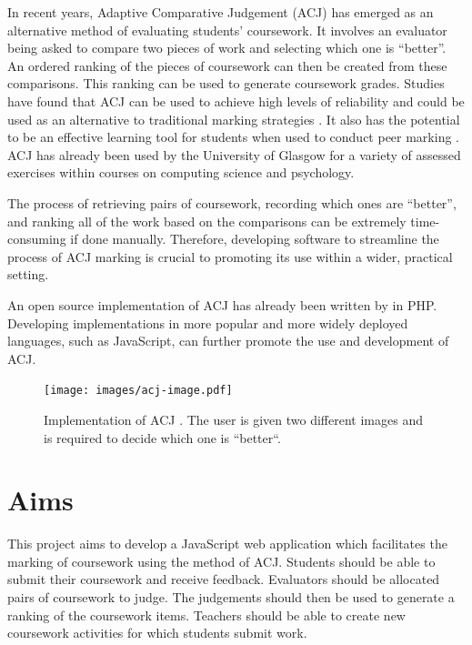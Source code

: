 \documentclass{l4proj}
\begin{document}
In recent years, Adaptive Comparative Judgement (ACJ) has emerged as an alternative method of evaluating students’ coursework. It involves an evaluator being asked to compare two pieces of work and selecting which one is “better”. An ordered ranking of the pieces of coursework can then be created from these comparisons. This ranking can be used to generate coursework grades. Studies have found that ACJ can be used to achieve high levels of reliability and could be used as an alternative to traditional marking strategies \citep{inproceedings, doi:10.1080/0969594X.2013.868341} . It also has the potential to be an effective learning tool for students when used to conduct peer marking \citep{bartholomew2019using}. ACJ has already been used by the University of Glasgow for a variety of assessed exercises within courses on computing science and psychology.

The process of retrieving pairs of coursework, recording which ones are “better”, and ranking all of the work based on the comparisons can be extremely time-consuming if done manually. Therefore, developing software to streamline the process of ACJ marking is crucial to promoting its use within a wider, practical setting.

An open source implementation of ACJ has already been written by \citet{nbarr:code} in PHP. Developing implementations in more popular and more widely deployed languages, such as JavaScript, can further promote the use and development of ACJ.


\begin{figure}
    \centering
    \texttt{[image: images/acj-image.pdf]}    

    \caption{ Implementation of ACJ \citep{nbarr}. The user is given two different images and is required to decide which one is ``better``.
    }
    \label{fig:acj-image} 
\end{figure}

\section{Aims}
This project aims to develop a JavaScript web application which facilitates the marking of coursework using the method of ACJ. Students should be able to submit their coursework and receive feedback. Evaluators should be allocated pairs of coursework to judge. The judgements should then be used to generate a ranking of the coursework items. Teachers should be able to create new coursework activities for which students submit work.
\end{document}
